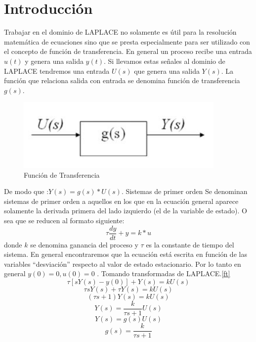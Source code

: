 \documentclass[12pt,a4paper]{report}
\begin{document}
\chapter{Introducción}
Trabajar en el dominio de LAPLACE no solamente es útil para la resolución matemática de
ecuaciones sino que se presta especialmente para ser utilizado con el concepto de
función de transferencia. En general un proceso recibe una entrada $u(t)$ y genera una
salida $y(t)$. Si llevamos estas señales al dominio de LAPLACE tendremos una entrada
$U(s)$ que genera una salida $Y(s)$. La función que relaciona salida con entrada se
denomina función de transferencia $g(s)$.\\
\begin{figure}[h!]
  \centering
    \includegraphics[width=4.0in]{funciontransferencia}
  \caption{Función de Transferencia}
\end{figure}
De modo que :$Y(s) = g(s)*U(s).$
Sistemas de primer orden
Se denominan sistemas de primer orden a aquellos en los que en la ecuación general
aparece solamente la derivada primera del lado izquierdo (el de la variable de estado). O
sea que se reducen al formato siguiente:
\begin{equation}
\tau\frac{dy}{dt}+y= k*u
\end{equation}
donde $k$ se denomina ganancia del proceso y $\tau$ es la constante de tiempo del sistema.
En general encontraremos que la ecuación está escrita en función de las variables
“desviación” respecto al valor de estado estacionario. Por lo tanto en general $y(0) = 0 ,
u(0) = 0$ . Tomando transformadas de LAPLACE.\ref{ft}
\begin{equation*}
\tau [s Y(s)-y(0)]+Y(s)=kU(s)
\end{equation*}
\begin{equation*}
\tau s Y(s)+ \tau Y(s)=kU(s)
\end{equation*}
\begin{equation*}
( \tau s+1)Y(s)=kU(s)
\end{equation*}
\begin{equation*}
Y(s)=\frac{k}{\tau s+1}U(s)
\end{equation*}
\begin{equation*}
Y(s)=g(s)U(s)
\end{equation*}
\begin{equation*}
g(s)=\frac{k}{\tau s+1}
\end{equation*}
\end{document}
